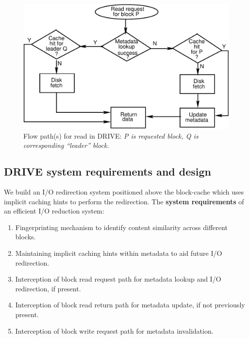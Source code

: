 \begin{figure}
\begin{minipage}{0.55\textwidth}
    \includegraphics[scale=0.5]{confided-figures/main/dedup-working-readflowcomp.pdf}
    \caption{Flow path(s) for read in DRIVE: \textit{P is requested block, Q is corresponding ``leader'' block.}}
    \label{fig:confided-working(b)}
	\end{minipage}
\end{figure}
\vspace{-0.2in}


\subsection{DRIVE system requirements and design}
We build an I/O redirection system positioned above the block-cache which uses implicit caching
hints to perform the redirection.
The \textbf{system requirements} of an efficient I/O reduction system:
\begin{enumerate}
	\singlespacing
	\small
\item Fingerprinting mechanism to identify content similarity across different blocks.
\item Maintaining implicit caching hints within metadata to aid future I/O redirection.
\item Interception of block read request path for metadata lookup and I/O redirection, if present.
\item Interception of block read return path for metadata update, if not previously present.
\item Interception of block write request path for metadata invalidation.
\end{enumerate}

